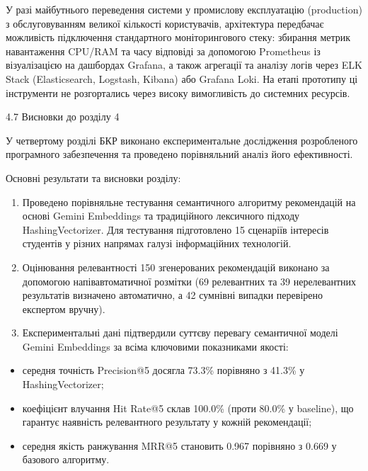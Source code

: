\documentclass[
]{article}
\begin{document}
У разі майбутнього переведення системи у промислову експлуатацію
(production) з обслуговуванням великої кількості користувачів,
архітектура передбачає можливість підключення стандартного
моніторингового стеку: збирання метрик навантаження CPU/RAM та часу
відповіді за допомогою Prometheus із візуалізацією на дашбордах Grafana,
а також агрегації та аналізу логів через ELK Stack (Elasticsearch,
Logstash, Kibana) або Grafana Loki. На етапі прототипу ці інструменти не
розгортались через високу вимогливість до системних ресурсів.

\protect{}\label{ux432ux438ux441ux43dux43eux432ux43aux438-ux434ux43e-ux440ux43eux437ux434ux456ux43bux443-4}{}4.7
Висновки до розділу 4

У четвертому розділі БКР виконано експериментальне дослідження
розробленого програмного забезпечення та проведено порівняльний аналіз
його ефективності.

Основні результати та висновки розділу:

\begin{enumerate}
\def\labelenumi{\arabic{enumi}.}
\item
  Проведено порівняльне тестування семантичного алгоритму рекомендацій
  на основі Gemini Embeddings та традиційного лексичного підходу
  HashingVectorizer. Для тестування підготовлено 15 сценаріїв інтересів
  студентів у різних напрямах галузі інформаційних технологій.
\item
  Оцінювання релевантності 150 згенерованих рекомендацій виконано за
  допомогою напівавтоматичної розмітки (69 релевантних та 39
  нерелевантних результатів визначено автоматично, а 42 сумнівні випадки
  перевірено експертом вручну).
\item
  Експериментальні дані підтвердили суттєву перевагу семантичної моделі
  Gemini Embeddings за всіма ключовими показниками якості:
\end{enumerate}

\begin{itemize}
\item
  середня точність Precision@5 досягла 73.3\% порівняно з 41.3\% у
  HashingVectorizer;
\item
  коефіцієнт влучання Hit Rate@5 склав 100.0\% (проти 80.0\% у
  baseline), що гарантує наявність релевантного результату у кожній
  рекомендації;
\item
  середня якість ранжування MRR@5 становить 0.967 порівняно з 0.669 у
  базового алгоритму.
\end{itemize}
\end{document}
